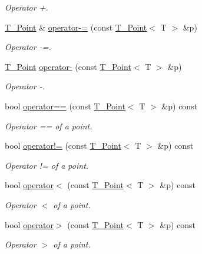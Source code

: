 \begin{DoxyCompactItemize}
\begin{DoxyCompactList}\small\item\em Operator +. \end{DoxyCompactList}\item 
\hyperlink{classT__Point}{T\+\_\+\+Point} \& \hyperlink{classT__Point_aa438de3090999e1f24f0de58dc5171a0}{operator-\/=} (const \hyperlink{classT__Point}{T\+\_\+\+Point}$<$ T $>$ \&p)
\begin{DoxyCompactList}\small\item\em Operator -\/=. \end{DoxyCompactList}\item 
\hyperlink{classT__Point}{T\+\_\+\+Point} \hyperlink{classT__Point_a4a3671d0a9763b3e749c799294ebb1ca}{operator-\/} (const \hyperlink{classT__Point}{T\+\_\+\+Point}$<$ T $>$ \&p)
\begin{DoxyCompactList}\small\item\em Operator -\/. \end{DoxyCompactList}\item 
bool \hyperlink{classT__Point_a83c15f53049523cc75c23350ceb4832a}{operator==} (const \hyperlink{classT__Point}{T\+\_\+\+Point}$<$ T $>$ \&p) const
\begin{DoxyCompactList}\small\item\em Operator == of a point. \end{DoxyCompactList}\item 
bool \hyperlink{classT__Point_ab92f1605c6f5008b42105b4c7a7fc1b2}{operator!=} (const \hyperlink{classT__Point}{T\+\_\+\+Point}$<$ T $>$ \&p) const
\begin{DoxyCompactList}\small\item\em Operator != of a point. \end{DoxyCompactList}\item 
bool \hyperlink{classT__Point_a95cb559fe5888b44481f6ad3aebabefe}{operator$<$} (const \hyperlink{classT__Point}{T\+\_\+\+Point}$<$ T $>$ \&p) const
\begin{DoxyCompactList}\small\item\em Operator $<$ of a point. \end{DoxyCompactList}\item 
bool \hyperlink{classT__Point_a0a9956de8ab7c8dccf35b78c43aedefd}{operator$>$} (const \hyperlink{classT__Point}{T\+\_\+\+Point}$<$ T $>$ \&p) const
\begin{DoxyCompactList}\small\item\em Operator $>$ of a point. \end{DoxyCompactList}\end{DoxyCompactItemize}

